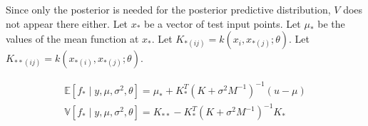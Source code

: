 \documentclass{article}
\begin{document}
Since only the posterior is needed for the posterior predictive distribution, $V$ does not appear there either.
Let $x_*$ be a vector of test input points.
Let $\mu_*$ be the values of the mean function at $x_*$.
Let $K_{*(ij)} = k(x_i, x_{*(j)}; \theta)$.
Let $K_{**(ij)} = k(x_{*(i)}, x_{*(j)}; \theta)$.

\begin{gather}
    \mathbb{E}[f_* \mid y, \mu, \sigma^2, \theta] =
    \mu_* + K_*^T (K + \sigma^2 M^{-1})^{-1} (u - \mu)
    \\
    \mathbb{V}[f_* \mid y, \mu, \sigma^2, \theta] =
    K_{**} - K_*^T (K + \sigma^2 M^{-1})^{-1} K_*
\end{gather}
\end{document}
